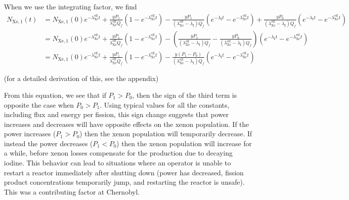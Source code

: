 \documentclass{report}
\begin{document}
When we use the integrating factor, we find
\begin{align*}
N_{\text{Xe},1}(t)	&= N_{\text{Xe},1}(0)e^{-\lambda_{\text{Xe}}^{\text{eff}}t} + \frac{yP_1}{\lambda_{\text{Xe}}^{\text{eff}}Q_f}\left(1-e^{-\lambda_{\text{Xe}}^{\text{eff}} t}\right) - \frac{yP_1}{(\lambda_{\text{Xe}}^{\text{eff}}-\lambda_{\text{I}}) Q_f} \left(e^{-\lambda_{\text{I}}t} - e^{-\lambda_{\text{Xe}}^{\text{eff}}t}\right) + \frac{yP_0}{(\lambda_{\text{Xe}}^{\text{eff}}-\lambda_{\text{I}}) Q_f} \left(e^{-\lambda_{\text{I}}t} - e^{-\lambda_{\text{Xe}}^{\text{eff}}t}\right) \\
					&= N_{\text{Xe},1}(0)e^{-\lambda_{\text{Xe}}^{\text{eff}}t} + \frac{yP_1}{\lambda_{\text{Xe}}^{\text{eff}}Q_f}\left(1-e^{-\lambda_{\text{Xe}}^{\text{eff}} t}\right) - \left(\frac{yP_1}{(\lambda_{\text{Xe}}^{\text{eff}}-\lambda_{\text{I}}) Q_f} - \frac{yP_0}{(\lambda_{\text{Xe}}^{\text{eff}}-\lambda_{\text{I}}) Q_f}\right) \left(e^{-\lambda_{\text{I}}t} - e^{-\lambda_{\text{Xe}}^{\text{eff}}t}\right) \\
					&= N_{\text{Xe},1}(0)e^{-\lambda_{\text{Xe}}^{\text{eff}}t} + \frac{yP_1}{\lambda_{\text{Xe}}^{\text{eff}}Q_f}\left(1-e^{-\lambda_{\text{Xe}}^{\text{eff}} t}\right) - \frac{y\left(P_1-P_0\right)}{(\lambda_{\text{Xe}}^{\text{eff}}-\lambda_{\text{I}}) Q_f} \left(e^{-\lambda_{\text{I}}t} - e^{-\lambda_{\text{Xe}}^{\text{eff}}t}\right)
\end{align*}
\begin{center}(for a detailed derivation of this, see the appendix)\end{center}

From this equation, we see that if $P_1 > P_0$, then the sign of the third term is opposite the case when $P_0 > P_1$. Using typical values for all the constants, including flux and energy per fission, this sign change suggests that power increases and decreases will have opposite effects on the xenon population. If the power increases ($P_1 > P_0$) then the xenon population will temporarily decrease. If instead the power decreases ($P_1 < P_0$) then the xenon population will increase for a while, before xenon losses compensate for the production due to decaying iodine. This behavior can lead to situations where an operator is unable to restart a reactor immediately after shutting down (power has decreased, fission product concentrations temporarily jump, and restarting the reactor is unsafe). This was a contributing factor at Chernobyl.
\end{document}
